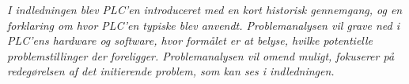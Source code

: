 \textit{I indledningen blev PLC’en introduceret med en kort historisk gennemgang, og en forklaring om hvor PLC’en typiske blev anvendt. Problemanalysen vil grave ned i PLC’ens hardware og software, hvor formålet er at belyse, hvilke potentielle problemstillinger der foreligger. Problemanalysen vil omend muligt, fokuserer på redegørelsen af det initierende problem, som kan ses i indledningen.}

